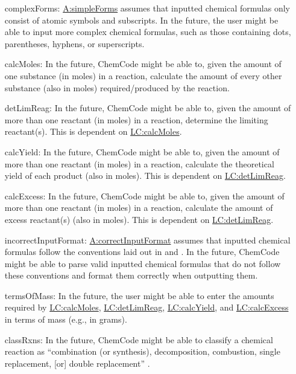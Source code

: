 \documentclass[12pt]{article}
\begin{document}
\begin{itemize}
\item[complexForms:\phantomsection\label{complexForms}]{\hyperref[simpleForms]{A:simpleForms} assumes that inputted chemical formulas only consist of atomic symbols and subscripts. In the future, the user might be able to input more complex chemical formulas, such as those containing dots, parentheses, hyphens, or superscripts.}
\item[calcMoles:\phantomsection\label{calcMoles}]{In the future, ChemCode might be able to, given the amount of one substance (in moles) in a reaction, calculate the amount of every other substance (also in moles) required/produced by the reaction.}
\item[detLimReag:\phantomsection\label{detLimReag}]{In the future, ChemCode might be able to, given the amount of more than one reactant (in moles) in a reaction, determine the limiting reactant(s). This is dependent on \hyperref[calcMoles]{LC:calcMoles}.}
\item[calcYield:\phantomsection\label{calcYield}]{In the future, ChemCode might be able to, given the amount of more than one reactant (in moles) in a reaction, calculate the theoretical yield of each product (also in moles). This is dependent on \hyperref[detLimReag]{LC:detLimReag}.}
\item[calcExcess:\phantomsection\label{calcExcess}]{In the future, ChemCode might be able to, given the amount of more than one reactant (in moles) in a reaction, calculate the amount of excess reactant(s) (also in moles). This is dependent on \hyperref[detLimReag]{LC:detLimReag}.}
\item[incorrectInputFormat:\phantomsection\label{incorrectInputFormat}]{\hyperref[correctInputFormat]{A:correctInputFormat} assumes that inputted chemical formulas follow the conventions laid out in \cite{inorganicIUPAC} and \cite{organicIUPAC}. In the future, ChemCode might be able to parse valid inputted chemical formulas that do not follow these conventions and format them correctly when outputting them.}
\item[termsOfMass:\phantomsection\label{termsOfMass}]{In the future, the user might be able to enter the amounts required by \hyperref[calcMoles]{LC:calcMoles}, \hyperref[detLimReag]{LC:detLimReag}, \hyperref[calcYield]{LC:calcYield}, and \hyperref[calcExcess]{LC:calcExcess} in terms of mass (e.g., in grams).}
\item[classRxns:\phantomsection\label{classRxns}]{In the future, ChemCode might be able to classify a chemical reaction as ``combination (or synthesis), decomposition, combustion, single replacement, [or] double replacement'' \cite[(pg. 301)]{lund2023}.}

\end{itemize}
\end{document}
